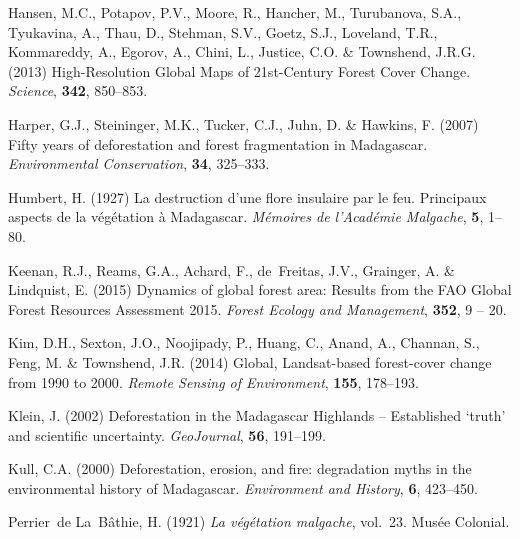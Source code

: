 \documentclass[a4paper, 12pt, leqno]{article} %
\begin{document}
\begin{thebibliography}{55}
Hansen, M.C., Potapov, P.V., Moore, R., Hancher, M., Turubanova, S.A.,
  Tyukavina, A., Thau, D., Stehman, S.V., Goetz, S.J., Loveland, T.R.,
  Kommareddy, A., Egorov, A., Chini, L., Justice, C.O. \& Townshend, J.R.G.
  (2013) {High-Resolution Global Maps of 21st-Century Forest Cover Change}.
\newblock \emph{Science}, \textbf{342}, 850--853.

Harper, G.J., Steininger, M.K., Tucker, C.J., Juhn, D. \& Hawkins, F. (2007)
  {Fifty years of deforestation and forest fragmentation in Madagascar}.
\newblock \emph{Environmental Conservation}, \textbf{34}, 325--333.

Humbert, H. (1927) {La destruction d'une flore insulaire par le feu. Principaux
  aspects de la végétation à Madagascar}.
\newblock \emph{Mémoires de l'Académie Malgache}, \textbf{5}, 1--80.

Keenan, R.J., Reams, G.A., Achard, F., de~Freitas, J.V., Grainger, A. \&
  Lindquist, E. (2015) {Dynamics of global forest area: Results from the FAO
  Global Forest Resources Assessment 2015}.
\newblock \emph{Forest Ecology and Management}, \textbf{352}, 9 -- 20.

Kim, D.H., Sexton, J.O., Noojipady, P., Huang, C., Anand, A., Channan, S.,
  Feng, M. \& Townshend, J.R. (2014) {Global, Landsat-based forest-cover change
  from 1990 to 2000}.
\newblock \emph{Remote Sensing of Environment}, \textbf{155}, 178--193.

Klein, J. (2002) {Deforestation in the Madagascar Highlands -- Established
  `truth' and scientific uncertainty}.
\newblock \emph{GeoJournal}, \textbf{56}, 191--199.

Kull, C.A. (2000) {Deforestation, erosion, and fire: degradation myths in the
  environmental history of Madagascar}.
\newblock \emph{Environment and History}, \textbf{6}, 423--450.

Perrier~de La~B{\^a}thie, H. (1921) \emph{{La v{\'e}g{\'e}tation malgache}},
  vol.~23.
\newblock Mus{\'e}e Colonial.


\end{thebibliography}
\end{document}
